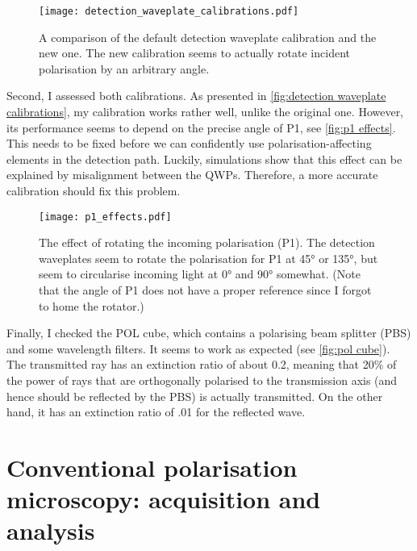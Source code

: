\begin{figure}
	\centering
	\texttt{[image: detection\_waveplate\_calibrations.pdf]}
	\caption{
		A comparison of the default detection waveplate calibration and the new one. The new calibration seems to actually rotate incident polarisation by an arbitrary angle.
	}
	\label{fig:detection waveplate calibrations}
\end{figure}


Second, I assessed both calibrations. As presented in \autoref{fig:detection waveplate calibrations}, my calibration works rather well, unlike the original one. However, its performance seems to depend on the precise angle of P1, see \autoref{fig:p1 effects}.
This needs to be fixed before we can confidently use polarisation-affecting elements in the detection path. Luckily, simulations show that this effect can be explained by misalignment between the QWPs. Therefore, a more accurate calibration should fix this problem.

\begin{figure}[h]
	\centering
	\texttt{[image: p1\_effects.pdf]}
	\caption{
		The effect of rotating the incoming polarisation (P1). The detection waveplates seem to rotate the polarisation for P1 at \ang{45} or \ang{135}, but seem to circularise incoming light at \ang{0} and \ang{90} somewhat. (Note that the angle of P1 does not have a proper reference since I forgot to home the rotator.)
	}
	\label{fig:p1 effects}
\end{figure}

Finally, I checked the POL cube, which contains a polarising beam splitter (PBS) and some wavelength filters. It seems to work as expected (see \autoref{fig:pol cube}). The transmitted ray has an extinction ratio of about 0.2, meaning that 20\% of the power of rays that are orthogonally polarised to the transmission axis (and hence should be reflected by the PBS) is actually transmitted. On the other hand, it has an extinction ratio of .01 for the reflected wave.

\section{Conventional polarisation microscopy: acquisition and analysis}
\label{sec:pol analysis}
 
